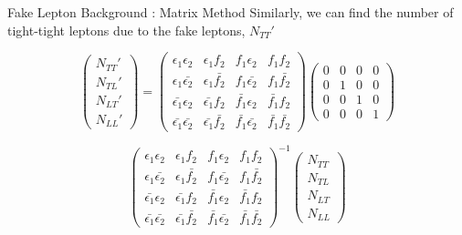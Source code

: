 \documentclass[mathserif,serif]{beamer}
\begin{document}
\begin{frame}{Fake Lepton Background : Matrix Method}
Similarly, we can find the number of tight-tight leptons due to the fake leptons, $N_{TT}'$

\begin{equation*}
\left( \begin{array}{c}
N_{TT}' \\
N_{TL}' \\
N_{LT}' \\
N_{LL}'
\end{array} \right)
=
\left( \begin{array}{cccc}
\epsilon_1 \epsilon_2 & \epsilon_1 f_2 & f_1 \epsilon_2 & f_1 f_2 \\
\epsilon_1 \bar{\epsilon_2} & \epsilon_1 \bar{f_2} & f_1 \bar{\epsilon_2} & f_1 \bar{f_2} \\
\bar{\epsilon_1} \epsilon_2 & \bar{\epsilon_1} f_2 & \bar{f_1} \epsilon_2 & \bar{f_1} f_2 \\
\bar{\epsilon_1} \bar{\epsilon_2} & \bar{\epsilon_1} \bar{f_2} & \bar{f_1} \bar{\epsilon_2} & \bar{f_1} \bar{f_2}
\end{array} \right)
\left( \begin{array}{cccc}
0 & 0 & 0 & 0 \\
0 & 1 & 0 & 0 \\
0 & 0 & 1 & 0 \\
0 & 0 & 0 & 1
\end{array} \right)
\end{equation*}

\begin{equation*}
\left( \begin{array}{cccc}
\epsilon_1 \epsilon_2 & \epsilon_1 f_2 & f_1 \epsilon_2 & f_1 f_2 \\
\epsilon_1 \bar{\epsilon_2} & \epsilon_1 \bar{f_2} & f_1 \bar{\epsilon_2} & f_1 \bar{f_2} \\
\bar{\epsilon_1} \epsilon_2 & \bar{\epsilon_1} f_2 & \bar{f_1} \epsilon_2 & \bar{f_1} f_2 \\
\bar{\epsilon_1} \bar{\epsilon_2} & \bar{\epsilon_1} \bar{f_2} & \bar{f_1} \bar{\epsilon_2} & \bar{f_1} \bar{f_2}
\end{array} \right)^{-1}
\left( \begin{array}{c}
N_{TT} \\
N_{TL} \\
N_{LT} \\
N_{LL}
\end{array} \right)
\end{equation*}
\end{frame}
\end{document}
